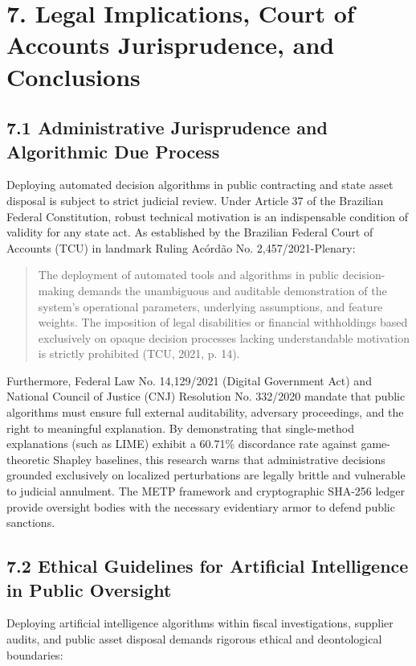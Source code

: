 \documentclass[10pt,a4paper,journal]{article}
\begin{document}
\section{7. Legal Implications, Court of Accounts Jurisprudence, and Conclusions}
\subsection{7.1 Administrative Jurisprudence and Algorithmic Due Process}
Deploying automated decision algorithms in public contracting and state asset disposal is subject to strict judicial review. Under Article 37 of the Brazilian Federal Constitution, robust technical motivation is an indispensable condition of validity for any state act. As established by the Brazilian Federal Court of Accounts (TCU) in landmark Ruling Acórdão No. 2,457/2021-Plenary:

\begin{quote}
\small The deployment of automated tools and algorithms in public decision-making demands the unambiguous and auditable demonstration of the system's operational parameters, underlying assumptions, and feature weights. The imposition of legal disabilities or financial withholdings based exclusively on opaque decision processes lacking understandable motivation is strictly prohibited (TCU, 2021, p. 14).
\end{quote}
Furthermore, Federal Law No. 14,129/2021 (Digital Government Act) and National Council of Justice (CNJ) Resolution No. 332/2020 mandate that public algorithms must ensure full external auditability, adversary proceedings, and the right to meaningful explanation. By demonstrating that single-method explanations (such as LIME) exhibit a 60.71\% discordance rate against game-theoretic Shapley baselines, this research warns that administrative decisions grounded exclusively on localized perturbations are legally brittle and vulnerable to judicial annulment. The METP framework and cryptographic SHA-256 ledger provide oversight bodies with the necessary evidentiary armor to defend public sanctions.

\subsection{7.2 Ethical Guidelines for Artificial Intelligence in Public Oversight}
Deploying artificial intelligence algorithms within fiscal investigations, supplier audits, and public asset disposal demands rigorous ethical and deontological boundaries:
\end{document}
